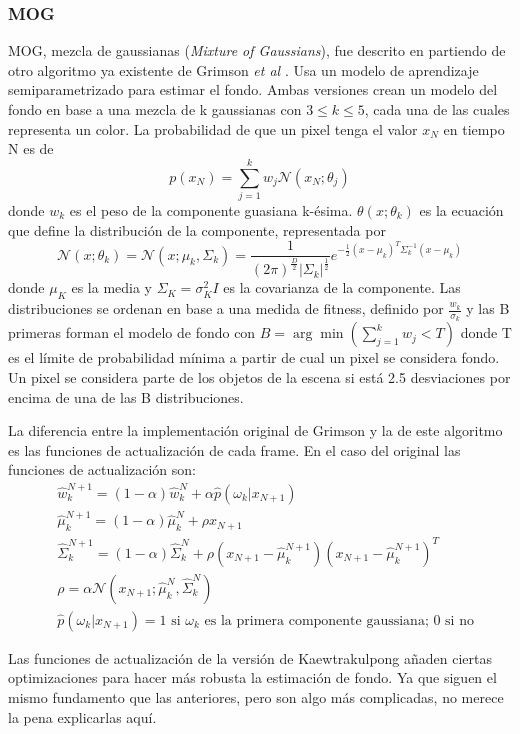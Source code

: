\subsubsection*{MOG}
MOG, mezcla de gaussianas (\textit{Mixture of Gaussians}), fue descrito en  \cite{KaewTraKulPong2002} partiendo de otro algoritmo ya existente de Grimson \textit{et al} \cite{698583,784637,868677}. Usa un modelo de aprendizaje semiparametrizado para estimar el fondo. Ambas versiones crean un modelo del fondo en base a una mezcla de k gaussianas con $3\leq k \leq 5$, cada una de las cuales representa un color. La probabilidad de que un pixel tenga el valor $x_N$ en tiempo N es de
\[
    p(x_N) = \sum_{j=1}^{k} w_j \mathcal{N} (x_N;\theta_j )
\]
donde $w_k$ es el peso de la componente guasiana k-ésima. $\theta(x;\theta_k)$ es la ecuación que define la distribución de la componente, representada por
\[
    \mathcal{N}(x;\theta_k) = \mathcal{N}(x;\mu_k, \Sigma_k) = \frac{1}{(2\pi)^{\frac{D}{2}}|\Sigma_k|^\frac{1}{2}}e^{-\frac{1}{2}(x-\mu_k)^T\Sigma_k^{-1}(x-\mu_k)}
\]
donde $\mu_K$ es la media y $\Sigma_K = \sigma_K^2I$ es la covarianza de la componente. Las distribuciones se ordenan en base a una medida de fitness, definido por $\frac{w_k}{\sigma_k}$ y las B primeras forman el modelo de fondo con $B = \arg\min (\sum_{j=1}^{k} w_j < T)$ donde T es el límite de probabilidad mínima a partir de cual un pixel se considera fondo. Un pixel se considera parte de los objetos de la escena si está 2.5 desviaciones por encima de una de las B distribuciones.

La diferencia entre la implementación original de Grimson y la de este algoritmo es las funciones de actualización de cada frame. En el caso del original las funciones de actualización son: 
\begin{align*}
    &\hat{w}_k^{N+1} = (1 - \alpha)\hat{w}_k^{N} + \alpha\hat{p}(\omega_k | x_{N+1}) \\
    &\hat{\mu}_k^{N+1} = (1 - \alpha)\hat{\mu}_k^{N} + \rho x_{N+1} \\
    &\hat{\Sigma}_k^{N+1} = (1 - \alpha)\hat{\Sigma}_k^{N} + \rho (x_{N+1} - \hat{\mu}_k^{N+1})(x_{N+1} - \hat{\mu}_k^{N+1})^T \\
    &\rho = \alpha \mathcal{N}(x_{N+1};\hat{\mu}_k^N, \hat{\Sigma}_k^N) \\
    &\hat{p}(\omega_k | x_{N+1}) = \text{1 si $\omega_k$ es la primera componente gaussiana; 0 si no}
\end{align*}

Las funciones de actualización de la versión de Kaewtrakulpong añaden ciertas optimizaciones para hacer más robusta la estimación de fondo. Ya que siguen el mismo fundamento que las anteriores, pero son algo más complicadas, no merece la pena explicarlas aquí.

